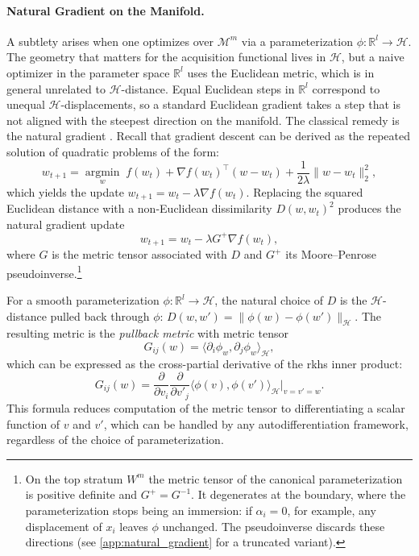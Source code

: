 \documentclass{article}
\newcommand{\R}{\mathbb{R}}
\newcommand{\Hs}{\mathcal{H}}
\newcommand{\transposed}{^\intercal}
\newcommand{\norm}[1]{\lVert #1 \rVert}
\newcommand{\inner}[2]{\langle #1, #2 \rangle}
\newcommand{\partialover}[1]{\frac{\partial}{\partial #1}}
\begin{document}
\paragraph{Natural Gradient on the Manifold.}
A subtlety arises when one optimizes over $\mathcal{M}^m$ via a parameterization $\phi : \R^l \to \Hs$. The geometry that matters for the acquisition functional lives in $\Hs$, but a naive optimizer in the parameter space $\R^l$ uses the Euclidean metric, which is in general unrelated to $\Hs$-distance.
Equal Euclidean steps in $\R^l$ correspond to unequal $\Hs$-displacements, so a standard Euclidean gradient takes a step that is not aligned with the steepest direction on the manifold.
The classical remedy is the natural gradient \citep{amari1998natural}. Recall that gradient descent can be derived as the repeated solution of quadratic problems of the form:
\begin{equation}
    w_{t+1} = \underset{w}{\operatorname{argmin}}\; f(w_t) + \nabla f(w_t)\transposed (w - w_t) + \frac{1}{2\lambda}\norm{w - w_t}_2^2,
\end{equation}
which yields the update $w_{t+1} = w_t - \lambda \nabla f(w_t)$. Replacing the squared Euclidean distance with a non-Euclidean dissimilarity $D(w, w_t)^2$ produces the natural gradient update
\begin{equation}
    w_{t+1} = w_t - \lambda G^{+} \nabla f(w_t),
\end{equation}
where $G$ is the metric tensor associated with $D$ and $G^{+}$ its Moore--Penrose pseudoinverse.\footnote{On the top stratum $W^m$ the metric tensor of the canonical parameterization is positive definite and $G^{+}=G^{-1}$. It degenerates at the boundary, where the parameterization stops being an immersion: if $\alpha_i = 0$, for example, any displacement of $x_i$ leaves $\phi$ unchanged. The pseudoinverse discards these directions (see \cref{app:natural_gradient} for a truncated variant).}

For a smooth parameterization $\phi: \R^l \to \Hs$, the natural choice of $D$ is the $\Hs$-distance pulled back through $\phi$: $D(w, w') = \norm{\phi(w) - \phi(w')}_\Hs$. The resulting metric is the \emph{pullback metric} with metric tensor
\begin{equation}
    G_{ij}(w) = \inner{\partial_i \phi_w}{\partial_j \phi_w}_\Hs,
    \label{eq:pullback}
\end{equation}
which can be expressed as the cross-partial derivative of the \gls{rkhs} inner product:
\begin{equation}
    G_{ij}(w) = \partialover{v_i}\partialover{v'_j}\inner{\phi(v)}{\phi(v')}_\Hs \bigg|_{v=v'=w}.
    \label{eq:pullback_autodiff}
\end{equation}
This formula reduces computation of the metric tensor to differentiating a scalar function of $v$ and $v'$, which can be handled by any autodifferentiation framework, regardless of the choice of parameterization.
\end{document}
